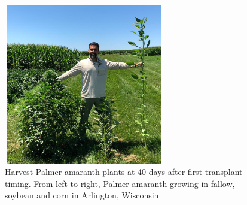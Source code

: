 \documentclass[utf8]{frontiersSCNS}
\begin{document}
\begin{figure}

{\centering \includegraphics[width=70mm,height=70mm]{../data analysis/figures/image} 

}

\caption{Harvest Palmer amaranth plants at 40 days after first transplant timing. From left to right, Palmer amaranth growing in fallow, soybean and corn in Arlington, Wisconsin}\label{fig:Figure-4}
\end{figure}
\end{document}
